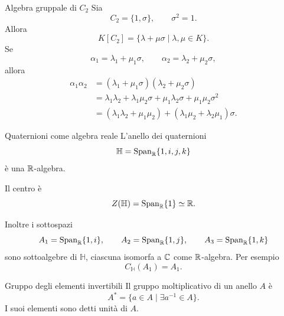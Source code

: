 \documentclass[a4paper]{article}
\begin{document}
\begin{radioactive}
\begin{snippetexample}{Algebra gruppale di \(C_2\)}
    Sia
    \[
        C_2=\{1,\sigma\},
        \qquad
        \sigma^2=1.
    \]
    Allora
    \[
        K[C_2]
        =
        \{\lambda+\mu\sigma\mid \lambda,\mu\in K\}.
    \]
    Se
    \[
        \alpha_1=\lambda_1+\mu_1\sigma,
        \qquad
        \alpha_2=\lambda_2+\mu_2\sigma,
    \]
    allora
    \begin{align*}
        \alpha_1\alpha_2
        &=
        (\lambda_1+\mu_1\sigma)(\lambda_2+\mu_2\sigma) \\
        &=
        \lambda_1\lambda_2
        +
        \lambda_1\mu_2\sigma
        +
        \mu_1\lambda_2\sigma
        +
        \mu_1\mu_2\sigma^2 \\
        &=
        (\lambda_1\lambda_2+\mu_1\mu_2)
        +
        (\lambda_1\mu_2+\lambda_2\mu_1)\sigma.
    \end{align*}
\end{snippetexample}
\end{radioactive}

\begin{radioactive}
\begin{snippetexample}{Quaternioni come algebra reale}
    L'anello dei quaternioni
    \[
        \mathbb{H}
        =
        \operatorname{Span}_{\mathbb{R}}\{1,i,j,k\}
    \]
    è una \(\mathbb{R}\)-algebra.

    Il centro è
    \[
        Z(\mathbb{H})=\operatorname{Span}_{\mathbb{R}}\{1\}\simeq \mathbb{R}.
    \]

    Inoltre i sottospazi
    \[
        A_1=\operatorname{Span}_{\mathbb{R}}\{1,i\},
        \qquad
        A_2=\operatorname{Span}_{\mathbb{R}}\{1,j\},
        \qquad
        A_3=\operatorname{Span}_{\mathbb{R}}\{1,k\}
    \]
    sono sottoalgebre di \(\mathbb{H}\), ciascuna isomorfa a \(\mathbb{C}\) come \(\mathbb{R}\)-algebra.
    Per esempio
    \[
        C_{\mathbb{H}}(A_1)=A_1.
    \]
\end{snippetexample}
\end{radioactive}

\begin{radioactive}
\begin{snippetdefinition}{Gruppo degli elementi invertibili}
    Il gruppo moltiplicativo di un anello \(A\) è
    \[
        A^\ast
        =
        \{a\in A\mid \exists a^{-1}\in A\}.
    \]
    I suoi elementi sono detti unità di \(A\).
\end{snippetdefinition}
\end{radioactive}
\end{document}
